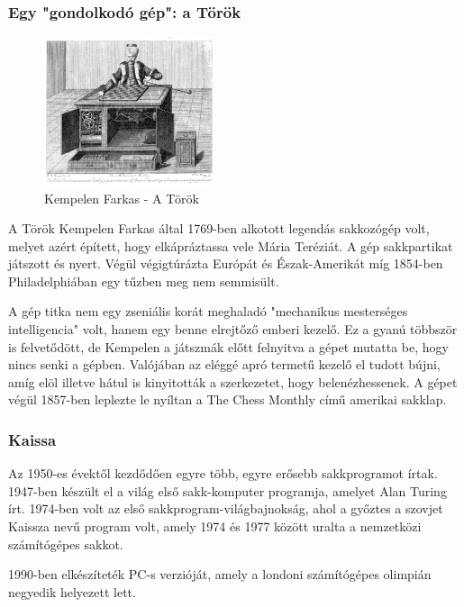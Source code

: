 \documentclass[twoside, a4paper, 12pt]{article}
\begin{document}
\subsubsection{Egy "gondolkodó gép": a Török}
\begin{figure}
	\caption{Kempelen Farkas - A Török}
	\label{fig:the_turk}
	\includegraphics[width=5.0cm]{img/the_turk}
\end{figure}
A Török Kempelen Farkas által 1769-ben alkotott legendás sakkozógép volt, melyet azért épített, hogy elkápráztassa vele Mária Teréziát. A gép sakkpartikat játszott és nyert. Végül végigtúrázta Európát és Észak-Amerikát míg 1854-ben Philadelphiában egy tűzben meg nem semmisült. 

A gép titka nem egy zseniális korát meghaladó "mechanikus mesterséges intelligencia" volt, hanem egy benne elrejtőző emberi kezelő. Ez a gyanú többször is felvetődött, de Kempelen a játszmák előtt felnyitva a gépet mutatta be, hogy nincs senki a gépben. Valójában az eléggé apró termetű kezelő el tudott bújni, amíg elöl illetve hátul is kinyitották a szerkezetet, hogy belenézhessenek. A gépet végül 1857-ben leplezte le nyíltan a The Chess Monthly című amerikai sakklap.\cite{MechanicalTurkHu}\cite{MechanicalTurkEn}\cite{CsodakKonyveHu}

\subsubsection{Kaissa}
Az 1950-es évektől kezdődően egyre több, egyre erősebb sakkprogramot írtak. 1947-ben készült el a világ első sakk-komputer programja, amelyet Alan Turing írt. 1974-ben volt az első sakkprogram-világbajnokság, ahol a győztes a szovjet Kaissza nevű program volt, amely 1974 és 1977 között uralta a nemzetközi számítógépes sakkot.\cite{chessProgramsHu}

1990-ben elkészíteték PC-s verzióját, amely a londoni számítógépes olimpián negyedik helyezett lett.\cite{KaissaEn}
\end{document}
